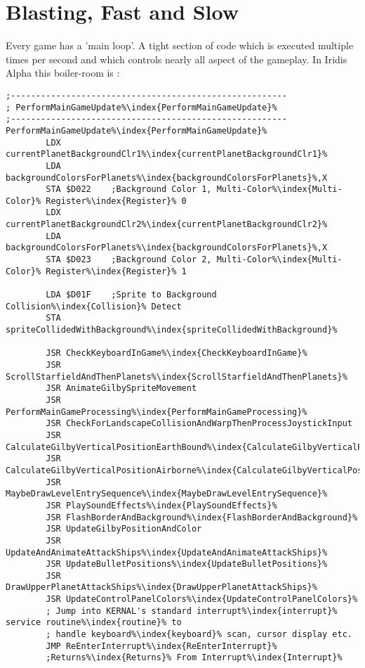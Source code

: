 \chapter{Blasting, Fast and Slow} 
\label{sec:blast}
\lstset{style=6502Style}

Every game has a 'main loop'. A tight section of code which is executed multiple times
per second and which controls nearly all aspect of the gameplay. In Iridis Alpha this
boiler-room is :

\begin{lstlisting}[escapechar=\%,caption=\icode{PerformMainGameUpdate\index{PerformMainGameUpdate}}\, the spaghetti junction handling nearly everything
during main gameplay.]
;-------------------------------------------------------
; PerformMainGameUpdate%\index{PerformMainGameUpdate}%
;-------------------------------------------------------
PerformMainGameUpdate%\index{PerformMainGameUpdate}%
        LDX currentPlanetBackgroundClr1%\index{currentPlanetBackgroundClr1}%
        LDA backgroundColorsForPlanets%\index{backgroundColorsForPlanets}%,X
        STA $D022    ;Background Color 1, Multi-Color%\index{Multi-Color}% Register%\index{Register}% 0
        LDX currentPlanetBackgroundClr2%\index{currentPlanetBackgroundClr2}%
        LDA backgroundColorsForPlanets%\index{backgroundColorsForPlanets}%,X
        STA $D023    ;Background Color 2, Multi-Color%\index{Multi-Color}% Register%\index{Register}% 1

        LDA $D01F    ;Sprite to Background Collision%\index{Collision}% Detect
        STA spriteCollidedWithBackground%\index{spriteCollidedWithBackground}%

        JSR CheckKeyboardInGame%\index{CheckKeyboardInGame}%
        JSR ScrollStarfieldAndThenPlanets%\index{ScrollStarfieldAndThenPlanets}%
        JSR AnimateGilbySpriteMovement
        JSR PerformMainGameProcessing%\index{PerformMainGameProcessing}%
        JSR CheckForLandscapeCollisionAndWarpThenProcessJoystickInput
        JSR CalculateGilbyVerticalPositionEarthBound%\index{CalculateGilbyVerticalPositionEarthBound}%
        JSR CalculateGilbyVerticalPositionAirborne%\index{CalculateGilbyVerticalPositionAirborne}%
        JSR MaybeDrawLevelEntrySequence%\index{MaybeDrawLevelEntrySequence}%
        JSR PlaySoundEffects%\index{PlaySoundEffects}%
        JSR FlashBorderAndBackground%\index{FlashBorderAndBackground}%
        JSR UpdateGilbyPositionAndColor
        JSR UpdateAndAnimateAttackShips%\index{UpdateAndAnimateAttackShips}%
        JSR UpdateBulletPositions%\index{UpdateBulletPositions}%
        JSR DrawUpperPlanetAttackShips%\index{DrawUpperPlanetAttackShips}%
        JSR UpdateControlPanelColors%\index{UpdateControlPanelColors}%
        ; Jump into KERNAL's standard interrupt%\index{interrupt}% service routine%\index{routine}% to 
        ; handle keyboard%\index{keyboard}% scan, cursor display etc.
        JMP ReEnterInterrupt%\index{ReEnterInterrupt}% 
        ;Returns%\index{Returns}% From Interrupt%\index{Interrupt}%
\end{lstlisting}

